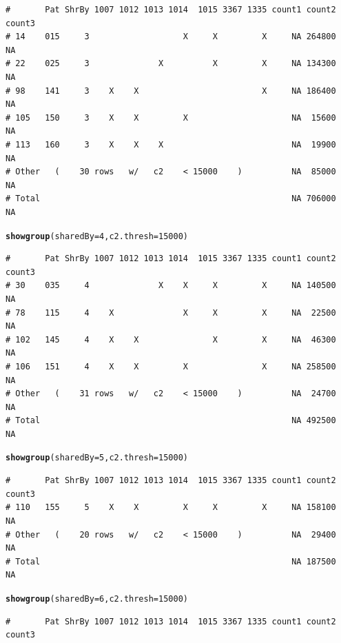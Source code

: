 \documentclass{article}\usepackage[]{graphicx}\usepackage[]{color}
\makeatletter
\newcommand{\hlnum}[1]{\textcolor[rgb]{0.686,0.059,0.569}{#1}}%
\newcommand{\hlstd}[1]{\textcolor[rgb]{0.345,0.345,0.345}{#1}}%
\newcommand{\hlkwc}[1]{\textcolor[rgb]{0.333,0.667,0.333}{#1}}%
\newcommand{\hlkwd}[1]{\textcolor[rgb]{0.737,0.353,0.396}{\textbf{#1}}}%
\newenvironment{kframe}{%
 \def\at@end@of@kframe{}%
 \ifinner\ifhmode%
  \def\at@end@of@kframe{\end{minipage}}%
  \begin{minipage}{\columnwidth}%
 \fi\fi%
 \def\FrameCommand##1{\hskip\@totalleftmargin \hskip-\fboxsep
 \colorbox{shadecolor}{##1}\hskip-\fboxsep
     \hskip-\linewidth \hskip-\@totalleftmargin \hskip\columnwidth}%
 \MakeFramed {\advance\hsize-\width
   \@totalleftmargin\z@ \linewidth\hsize
   \@setminipage}}%
 {\par\unskip\endMakeFramed%
 \at@end@of@kframe}
\newenvironment{knitrout}{}{} %
\makeatother
\begin{document}
\begin{knitrout}
\begin{kframe}
\begin{alltt}
\end{alltt}
\begin{verbatim}
#       Pat ShrBy 1007 1012 1013 1014  1015 3367 1335 count1 count2 count3
# 14    015     3                   X     X         X     NA 264800     NA
# 22    025     3              X          X         X     NA 134300     NA
# 98    141     3    X    X                         X     NA 186400     NA
# 105   150     3    X    X         X                     NA  15600     NA
# 113   160     3    X    X    X                          NA  19900     NA
# Other   (    30 rows   w/   c2    < 15000    )          NA  85000     NA
# Total                                                   NA 706000     NA
\end{verbatim}
\begin{alltt}
\hlkwd{showgroup}\hlstd{(}\hlkwc{sharedBy}\hlstd{=}\hlnum{4}\hlstd{,} \hlkwc{c2.thresh}\hlstd{=}\hlnum{15000}\hlstd{)}
\end{alltt}
\begin{verbatim}
#       Pat ShrBy 1007 1012 1013 1014  1015 3367 1335 count1 count2 count3
# 30    035     4              X    X     X         X     NA 140500     NA
# 78    115     4    X              X     X         X     NA  22500     NA
# 102   145     4    X    X               X         X     NA  46300     NA
# 106   151     4    X    X         X               X     NA 258500     NA
# Other   (    31 rows   w/   c2    < 15000    )          NA  24700     NA
# Total                                                   NA 492500     NA
\end{verbatim}
\begin{alltt}
\hlkwd{showgroup}\hlstd{(}\hlkwc{sharedBy}\hlstd{=}\hlnum{5}\hlstd{,} \hlkwc{c2.thresh}\hlstd{=}\hlnum{15000}\hlstd{)}
\end{alltt}
\begin{verbatim}
#       Pat ShrBy 1007 1012 1013 1014  1015 3367 1335 count1 count2 count3
# 110   155     5    X    X         X     X         X     NA 158100     NA
# Other   (    20 rows   w/   c2    < 15000    )          NA  29400     NA
# Total                                                   NA 187500     NA
\end{verbatim}
\begin{alltt}
\hlkwd{showgroup}\hlstd{(}\hlkwc{sharedBy}\hlstd{=}\hlnum{6}\hlstd{,} \hlkwc{c2.thresh}\hlstd{=}\hlnum{15000}\hlstd{)}
\end{alltt}
\begin{verbatim}
#       Pat ShrBy 1007 1012 1013 1014  1015 3367 1335 count1 count2 count3

\end{verbatim}
\end{kframe}
\end{knitrout}
\end{document}
